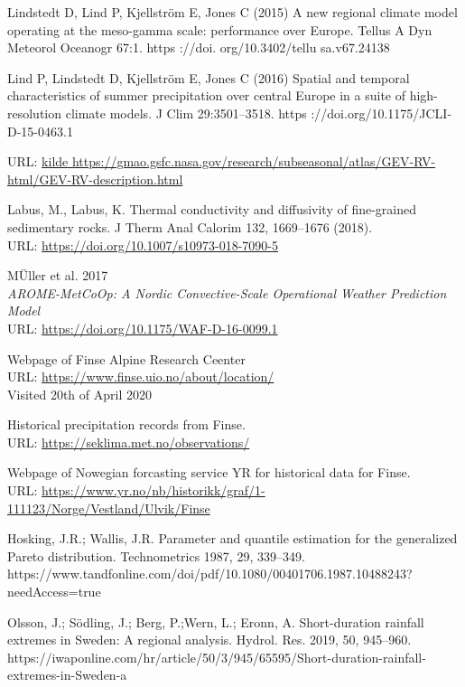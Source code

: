 \begin{thebibliography}{9}
Lindstedt D, Lind P, Kjellström E, Jones C (2015) A new regional
climate model operating at the meso-gamma scale: performance
over Europe. Tellus A Dyn Meteorol Oceanogr 67:1. https ://doi.
org/10.3402/tellu sa.v67.24138

Lind P, Lindstedt D, Kjellström E, Jones C (2016) Spatial and temporal
characteristics of summer precipitation over central Europe in a
suite of high-resolution climate models. J Clim 29:3501–3518.
https ://doi.org/10.1175/JCLI-D-15-0463.1

URL: \url{kilde https://gmao.gsfc.nasa.gov/research/subseasonal/atlas/GEV-RV-html/GEV-RV-description.html}

Labus, M., Labus, K. Thermal conductivity and diffusivity of fine-grained sedimentary rocks. J Therm Anal Calorim 132, 1669–1676 (2018). \\
URL: \url{https://doi.org/10.1007/s10973-018-7090-5}

MÜller et al. 2017\\
\textit{AROME-MetCoOp: A Nordic Convective-Scale Operational
Weather Prediction Model}\\
URL: \url{https://doi.org/10.1175/WAF-D-16-0099.1}

Webpage of Finse Alpine Research Ceenter\\
URL: \url{https://www.finse.uio.no/about/location/}\\
Visited 20th of April 2020

Historical precipitation records from Finse.\\
URL: \url{https://seklima.met.no/observations/}

Webpage of Nowegian forcasting service YR for historical data for Finse.\\
URL: \url{https://www.yr.no/nb/historikk/graf/1-111123/Norge/Vestland/Ulvik/Finse}

Hosking, J.R.; Wallis, J.R. Parameter and quantile estimation for the generalized Pareto distribution.
Technometrics 1987, 29, 339–349.
https://www.tandfonline.com/doi/pdf/10.1080/00401706.1987.10488243?needAccess=true

Olsson, J.; Södling, J.; Berg, P.;Wern, L.; Eronn, A. Short-duration rainfall extremes in Sweden: A regional
analysis. Hydrol. Res. 2019, 50, 945–960.
https://iwaponline.com/hr/article/50/3/945/65595/Short-duration-rainfall-extremes-in-Sweden-a


\end{thebibliography}
